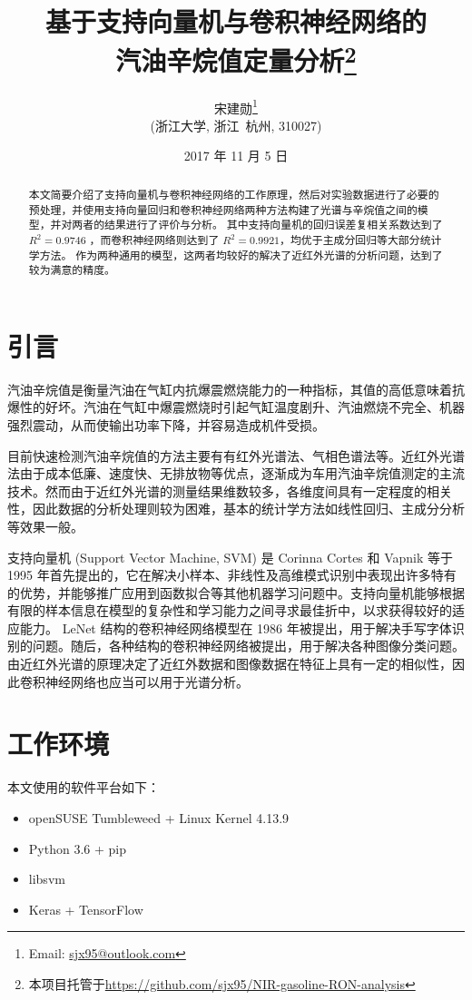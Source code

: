 \documentclass[a4paper, 12pt]{article}
\title{基于支持向量机与卷积神经网络的\\汽油辛烷值定量分析\footnote{本项目托管于\url{https://github.com/sjx95/NIR-gasoline-RON-analysis}}}
\author{宋建勋\thanks{Email: \href{mailto:sjx95@outlook.com}{sjx95@outlook.com}} \\ \small(浙江大学, 浙江~杭州, 310027)}
\date{\small 2017 年 11 月 5 日}
\begin{document}
	\maketitle
	
	\begin{abstract}
		本文简要介绍了支持向量机与卷积神经网络的工作原理，然后对实验数据进行了必要的预处理，并使用支持向量回归和卷积神经网络两种方法构建了光谱与辛烷值之间的模型，并对两者的结果进行了评价与分析。
		其中支持向量机的回归误差复相关系数达到了 $R^2=0.9746$ ，而卷积神经网络则达到了 $R^2=0.9921$，均优于主成分回归等大部分统计学方法。
		作为两种通用的模型，这两者均较好的解决了近红外光谱的分析问题，达到了较为满意的精度。
	\end{abstract}
	
	
	\section{引言}
		汽油辛烷值是衡量汽油在气缸内抗爆震燃烧能力的一种指标，其值的高低意味着抗爆性的好坏。汽油在气缸中爆震燃烧时引起气缸温度剧升、汽油燃烧不完全、机器强烈震动，从而使输出功率下降，并容易造成机件受损。
		
		目前快速检测汽油辛烷值的方法主要有有红外光谱法、气相色谱法等。近红外光谱法由于成本低廉、速度快、无排放物等优点，逐渐成为车用汽油辛烷值测定的主流技术。然而由于近红外光谱的测量结果维数较多，各维度间具有一定程度的相关性，因此数据的分析处理则较为困难，基本的统计学方法如线性回归、主成分分析等效果一般。
		
		支持向量机 (Support Vector Machine, SVM) 是 Corinna Cortes 和 Vapnik 等于 1995 年首先提出的，它在解决小样本、非线性及高维模式识别中表现出许多特有的优势，并能够推广应用到函数拟合等其他机器学习问题中。支持向量机能够根据有限的样本信息在模型的复杂性和学习能力之间寻求最佳折中，以求获得较好的适应能力。
		LeNet 结构的卷积神经网络模型在 1986 年被提出，用于解决手写字体识别的问题。随后，各种结构的卷积神经网络被提出，用于解决各种图像分类问题。由近红外光谱的原理决定了近红外数据和图像数据在特征上具有一定的相似性，因此卷积神经网络也应当可以用于光谱分析。
		
	\section{工作环境}
		\noindent 本文使用的软件平台如下：
		
		\begin{itemize}
			\item openSUSE Tumbleweed + Linux Kernel 4.13.9
			\item Python 3.6 + pip
			\item libsvm
			\item Keras + TensorFlow
		\end{itemize}
	
\end{document}
